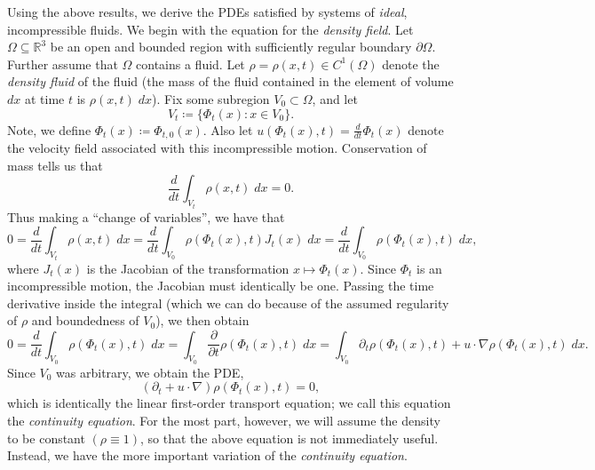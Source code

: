 \documentclass{article}
\begin{document}
Using the above results, we derive the PDEs satisfied by systems of \textit{ideal}, incompressible fluids. We begin with the equation for the \textit{density field}. Let $\Omega \subseteq \mathbb{R}^{3}$ be an open and bounded region with sufficiently regular boundary $\partial \Omega$. Further assume that $\Omega$ contains a fluid. Let $\rho = \rho(x, t) \in C^{1}(\Omega)$ denote the \textit{density fluid} of the fluid (the mass of the fluid contained in the element of volume $dx$ at time $t$ is $\rho(x, t)\;dx$). Fix some subregion $V_{0} \subset \Omega$, and let 
\begin{equation*}
	V_{t} \coloneqq \{\Phi_{t}(x): x \in V_{0}\}. 
\end{equation*}
Note, we define $\Phi_{t}(x) \coloneqq \Phi_{t,0}(x)$. Also let $u(\Phi_{t}(x), t) = \frac{d}{dt}\Phi_{t}(x)$ denote the velocity field associated with this incompressible motion. Conservation of mass tells us that 
\begin{equation*}
	\frac{d}{dt}\int_{V_{t}}\rho(x, t)\;dx = 0. 
\end{equation*}
Thus making a ``change of variables'', we have that 
\begin{equation*}
	0 = \frac{d}{dt}\int_{V_{t}}\rho(x, t)\;dx = \frac{d}{dt}\int_{V_{0}}\rho(\Phi_{t}(x), t)J_{t}(x)\;dx = \frac{d}{dt}\int_{V_{0}}\rho(\Phi_{t}(x),t)\;dx, 
\end{equation*} 
where $J_{t}(x)$ is  the Jacobian of the transformation $x \mapsto \Phi_{t}(x)$. Since $\Phi_{t}$ is an incompressible motion, the Jacobian must identically be one. Passing the time derivative inside the integral (which we can do because of the assumed regularity of $\rho$ and boundedness of $V_{0}$), we then obtain 
\begin{equation*}
	0 = \frac{d}{dt}\int_{V_{0}}\rho(\Phi_{t}(x),t)\;dx = \int_{V_{0}}\frac{\partial}{\partial t}\rho(\Phi_{t}(x),t)\;dx = \int_{V_{0}}\partial_{t}\rho(\Phi_{t}(x),t) + u \cdot \nabla \rho(\Phi_{t}(x),t)\;dx. 
\end{equation*} 
Since $V_{0}$ was arbitrary, we obtain the PDE, $$(\partial_{t} + u \cdot \nabla)\rho(\Phi_{t}(x), t) = 0,$$  which is identically the linear first-order transport equation; we call this equation the \textit{continuity equation}. For the most part, however, we will assume the density to be constant $(\rho \equiv 1)$, so that the above equation is not immediately useful. Instead, we have the more important variation of the \textit{continuity equation}. 
\end{document}
